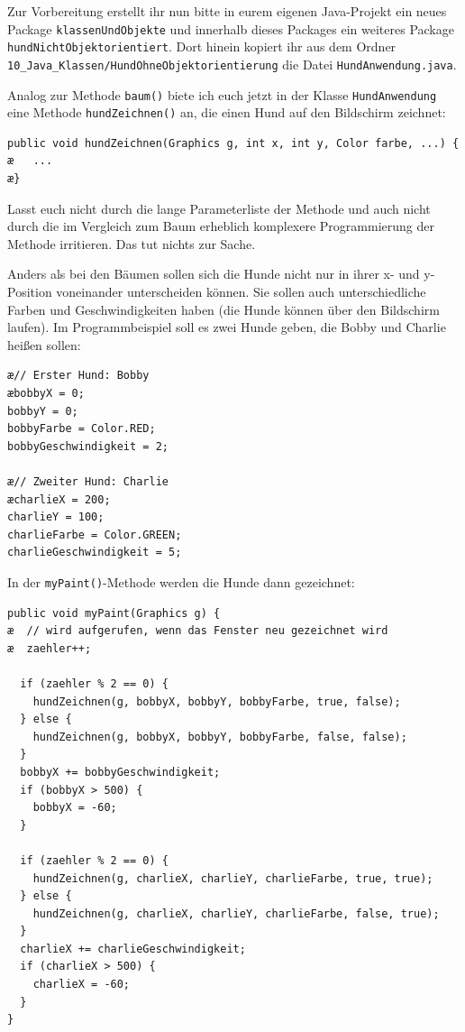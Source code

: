 Zur Vorbereitung erstellt ihr nun bitte in eurem eigenen Java-Projekt ein neues Package \lstinline|klassenUndObjekte| 
und innerhalb dieses Packages ein weiteres Package \lstinline|hundNichtObjektorientiert|. Dort hinein kopiert ihr
aus dem Ordner \lstinline|10_Java_Klassen/HundOhneObjektorientierung| die Datei \lstinline|HundAnwendung.java|.

Analog zur Methode \lstinline|baum()| biete ich euch jetzt in der Klasse \lstinline|HundAnwendung| eine Methode 
\lstinline|hundZeichnen()| an, die einen Hund auf den Bildschirm zeichnet:

\begin{lstlisting}
public void hundZeichnen(Graphics g, int x, int y, Color farbe, ...) {
æ   ...
æ}
\end{lstlisting}

Lasst euch nicht durch die lange Parameterliste der Methode und auch nicht durch die im Vergleich zum
Baum erheblich komplexere Programmierung der Methode irritieren. Das tut nichts zur Sache.

Anders als bei den Bäumen sollen sich die Hunde nicht nur in ihrer x- und y-Position voneinander 
unterscheiden können. Sie sollen auch unterschiedliche Farben und Geschwindigkeiten haben (die Hunde können 
über den Bildschirm laufen). Im Programmbeispiel soll es zwei Hunde geben, die Bobby und Charlie heißen sollen:

\begin{lstlisting}
æ// Erster Hund: Bobby
æbobbyX = 0;
bobbyY = 0;
bobbyFarbe = Color.RED;
bobbyGeschwindigkeit = 2;

æ// Zweiter Hund: Charlie
æcharlieX = 200;
charlieY = 100;
charlieFarbe = Color.GREEN;
charlieGeschwindigkeit = 5;
\end{lstlisting}

In der \lstinline|myPaint()|-Methode werden die Hunde dann gezeichnet:

\begin{lstlisting} 
public void myPaint(Graphics g) {
æ  // wird aufgerufen, wenn das Fenster neu gezeichnet wird
æ  zaehler++;
		
  if (zaehler % 2 == 0) {
    hundZeichnen(g, bobbyX, bobbyY, bobbyFarbe, true, false);
  } else {
    hundZeichnen(g, bobbyX, bobbyY, bobbyFarbe, false, false);
  }
  bobbyX += bobbyGeschwindigkeit;
  if (bobbyX > 500) {
    bobbyX = -60;
  }

  if (zaehler % 2 == 0) {
    hundZeichnen(g, charlieX, charlieY, charlieFarbe, true, true);
  } else {
    hundZeichnen(g, charlieX, charlieY, charlieFarbe, false, true);
  }
  charlieX += charlieGeschwindigkeit;
  if (charlieX > 500) {
    charlieX = -60;
  }
}
\end{lstlisting}

